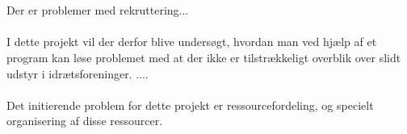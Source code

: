 \\
\\
Der er problemer med rekruttering...  %
\\
\\
I dette projekt vil der derfor blive undersøgt, hvordan man ved hjælp af et program kan løse problemet med at der ikke er tilstrækkeligt overblik over slidt udstyr i idrætsforeninger. .... %
\\
\\
Det initierende problem for dette projekt er ressourcefordeling, og specielt organisering af disse ressourcer. 
\\
\\



